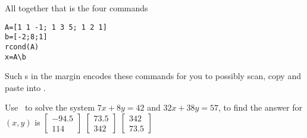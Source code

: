 \begin{example}
\begin{solution}
\begin{enumerate}
\end{enumerate}
All together that is the four commands
\begin{verbatim}
A=[1 1 -1; 1 3 5; 1 2 1]
b=[-2;8;1]
rcond(A)
x=A\b
\end{verbatim}
\setbox\ajrqrbox\hbox{}%
\marginpar{\usebox{\ajrqrbox\\[2ex]}}%
Such s in the margin encodes these commands for you to possibly scan, copy and paste into \script.
\end{solution}
\end{example}



\begin{activity}
Use \script\ to solve the system \(7x+8y=42\) and \(32x+38y=57\), to find the answer for \((x,y)\) is
{\(\begin{bmatrix} -94.5\\114 \end{bmatrix}\)}
{\(\begin{bmatrix} 73.5\\342 \end{bmatrix}\)}
{\(\begin{bmatrix} 342\\73.5 \end{bmatrix}\)}
\end{activity}





